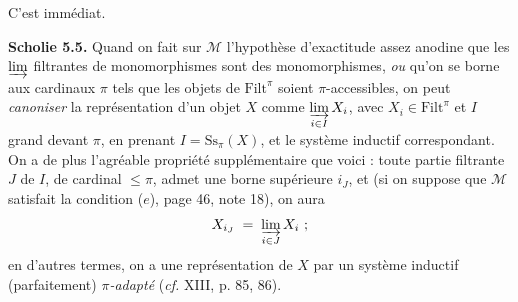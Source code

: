 \documentclass[11pt]{article}
\newcommand{\msp}[1]{\marginpar{\footnotesize [#1]}}
\newcommand{\cM}{\mathcal{M}}
\newcommand{\Filt}{\mathrm{Filt}}
\newcommand{\Ss}{\mathrm{Ss}}
\begin{document}
C'est immédiat.

\msp{page 49}
\textbf{Scholie 5.5.} Quand on fait sur $\cM$ l'hypothèse d'exactitude assez anodine que les $\varinjlim$ filtrantes de monomorphismes sont des monomorphismes, \textit{ou} qu'on se borne aux cardinaux $\pi$ tels que les objets de $\Filt^{\pi}$ soient $\pi$-accessibles, on peut \textit{canoniser} la représentation d'un objet $X$ comme $\varinjlim\limits_{i\in I} X_i$, avec $X_i \in \Filt^{\pi}$ et $I$ grand devant $\pi$, en prenant $I = \Ss_{\pi}(X)$, et le système inductif correspondant. On a de plus l'agréable propriété supplémentaire que voici : toute partie filtrante $J$ de $I$, de cardinal $\leq \pi$, admet une borne supérieure $i_J$, et (si on suppose que $\cM$ satisfait la condition ($e$), page 46, note 18), on aura
\[
X_{i_J} \;=\; \varinjlim_{i\in J} X_i \ ;
\]
en d'autres termes, on a une représentation de $X$ par un système inductif (parfaitement) \textit{$\pi$-adapté} (\textit{cf.} XIII, p. 85, 86).
\end{document}
